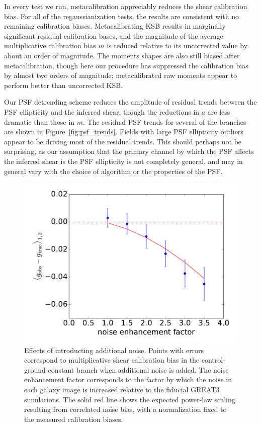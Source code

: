 \documentclass[iop]{emulateapj}
\begin{document}
In every test we run, metacalibration appreciably reduces the shear
calibration bias. For all of the regaussianization tests, the results
are consistent with no remaining calibration biases. Metacalibrating
KSB results in marginally significant residual calibration bases, and
the magnitude of the average multiplicative calibration bias $m$ is
reduced relative to its uncorrected value by about an order of
magnitude. The moments shapes are also still biased after
metacalibration, though here our procedure has suppressed the
calibration bias by almost two orders of magnitude; metacalibrated raw
moments appear to perform better than uncorrected KSB.

Our PSF detrending scheme reduces the amplitude of
residual trends between the PSF ellipticity and the inferred shear, though the
reductions in $a$ are less dramatic than those in $m$. The residual
PSF trends for several of the branches are shown in
Figure~\ref{fig:psf_trends}. Fields with large PSF ellipticity
outliers appear to be driving most of the residual trends. This should
perhaps not be surprising, as our assumption that the primary channel
by which the PSF affects the inferred shear is the PSF ellipticity is
not completely general, and may in general vary with the choice of
algorithm or the properties of the PSF. 



\begin{figure}
\includegraphics[width=\columnwidth]{./Plots/noise_bias_test.pdf}
\caption{Effects of introducting additional noise. Points with errors
  correspond to multiplicative shear calibration bias in the
  control-ground-constant branch when additional noise is added. The
  noise enhancement factor corresponds to the factor by which the
  noise in each galaxy image is increased relative to the fiducial
  GREAT3 simulations. The solid red line shows the expected power-law scaling
  resulting from correlated noise bias, with a normalization fixed to
  the measured calibration biases.}
\label{fig:noise_bias}
\end{figure}
\end{document}
